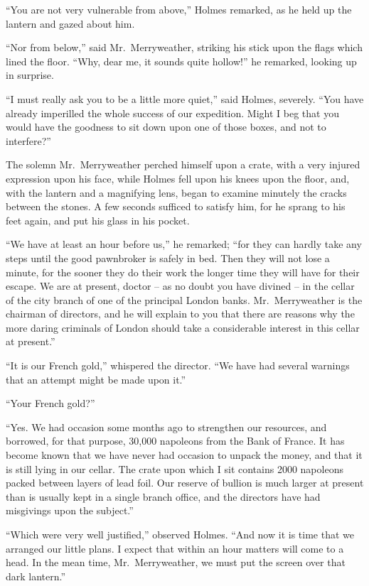 “You are not very vulnerable from above,” Holmes
remarked, as he held up the lantern and gazed about him.

“Nor from below,” said Mr.~Merryweather, striking his
stick upon the flags which lined the floor. “Why, dear me,
it sounds quite hollow!” he remarked, looking up in surprise.

“I must really ask you to be a little more quiet,” said
Holmes, severely. “You have already imperilled the whole
success of our expedition. Might I beg that you would have
the goodness to sit down upon one of those boxes, and not
to interfere?”

The solemn Mr.~Merryweather perched himself upon a
crate, with a very injured expression upon his face, while
Holmes fell upon his knees upon the floor, and, with the lantern
and a magnifying lens, began to examine minutely the
cracks between the stones. A few seconds sufficed to satisfy
him, for he sprang to his feet again, and put his glass in his
pocket.

“We have at least an hour before us,” he remarked; “for
they can hardly take any steps until the good pawnbroker is
safely in bed. Then they will not lose a minute, for the
sooner they do their work the longer time they will have for
their escape. We are at present, doctor -- as no doubt you
have divined -- in the cellar of the city branch of one of the
principal London banks. Mr.~Merryweather is the chairman
of directors, and he will explain to you that there are reasons
why the more daring criminals of London should take a
considerable interest in this cellar at present.”

“It is our French gold,” whispered the director. “We
have had several warnings that an attempt might be made
upon it.”

“Your French gold?”

“Yes. We had occasion some months ago to strengthen
our resources, and borrowed, for that purpose, 30,000
nap\-ol\-eons from the Bank of France. It has become known that
we have never had occasion to unpack the money, and that
it is still lying in our cellar. The crate upon which I sit
contains 2000 napoleons packed between layers of lead foil.
Our reserve of bullion is much larger at present than is usually
kept in a single branch office, and the directors have had
misgivings upon the subject.”

“Which were very well justified,” observed Holmes. “And
now it is time that we arranged our little plans. I expect
that within an hour matters will come to a head. In the
mean time, Mr.~Merryweather, we must put the screen over
that dark lantern.”

